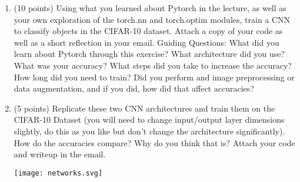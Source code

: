 \documentclass{article}
\author{Tarushii Goel}
\date{2020}
\begin{document}
\begin{center}
\end{center}
 
\vspace{5mm}
 
 
\vspace{5mm}

\begin{enumerate}
	\item (10 points) Using what you learned about Pytorch in the lecture, as well as your own exploration of the torch.nn and torch.optim modules, train a CNN to classify objects in the CIFAR-10 dataset. Attach a copy of your code as well as a short reflection in your email. Guiding Questions: What did you learn about Pytorch through this exercise? What architecture did you use? What was your accuracy? What steps did you take to increase the accuracy? How long did you need to train? Did you perform and image preprocessing or data augmentation, and if you did, how did that affect accuracies? \\ 
	\pagebreak
	\item (5 points) Replicate these two CNN architectures and train them on the CIFAR-10 Dataset (you will need to change input/output layer dimensions slightly, do this as you like but don't change the architecture significantly). How do the accuracies compare? Why do you think that is? Attach your code and writeup in the email. 
\begin{center}
\texttt{[image: networks.svg]}
\end{center}

\end {enumerate}
\end{document}
